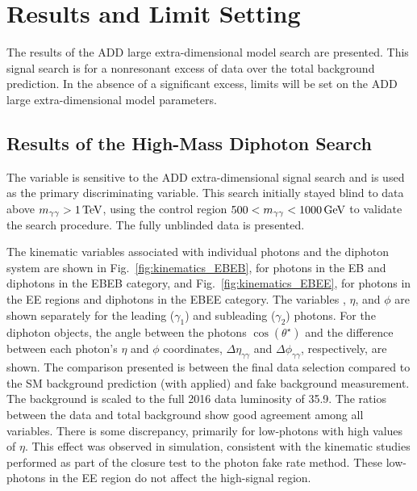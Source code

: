 \chapter{Results and Limit Setting}\label{ch:results}

The results of the ADD large extra-dimensional model search are presented. This signal search is for a nonresonant excess of data over the total background prediction. In the absence of a significant excess, limits will be set on the ADD large extra-dimensional model parameters.


\section{Results of the High-Mass Diphoton Search}

The variable \mgg is sensitive to the ADD extra-dimensional signal search and is used as the primary discriminating variable. This search initially stayed blind to data above $m_{\gamma\gamma} > 1\,\text{Te\hspace{-.08em}V}$, using the control region $500 < m_{\gamma\gamma} < 1000\,\text{Ge\hspace{-.08em}V}$ to validate the search procedure. The fully unblinded data is presented.

The kinematic variables associated with individual photons and the diphoton system are shown in Fig.~\ref{fig:kinematics_EBEB}, for photons in the EB and diphotons in the EBEB category, and Fig.~\ref{fig:kinematics_EBEE}, for photons in the EE regions and diphotons in the EBEE category. The variables \pt, $\eta$, and $\phi$ are shown separately for the leading ($\gamma_1$) and subleading ($\gamma_2$) photons. For the diphoton objects, the angle between the photons $\cos(\theta^{\star})$ and the difference between each photon's $\eta$ and $\phi$ coordinates, $\Delta\eta_{\gamma\gamma}$ and $\Delta\phi_{\gamma\gamma}$, respectively, are shown. The comparison presented is between the final data selection compared to the SM background prediction (with \Kfactor applied) and fake background measurement. The background is scaled to the full 2016 data luminosity of 35.9\fbinv. The ratios between the data and total background show good agreement among all variables. There is some discrepancy, primarily for low-\pt photons with high values of $\eta$. This effect was observed in simulation, consistent with the kinematic studies performed as part of the closure test to the photon fake rate method. These low-\pt photons in the EE region do not affect the high-\mgg signal region.



